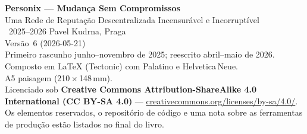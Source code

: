 \thispagestyle{empty}
\ifdefined\printmode\vspace*{\fill}\else{}\fi
\begin{flushleft}\small\sffamily
\textbf{Personix --- Mudança Sem Compromissos}\\[0.3em]
Uma Rede de Reputação Descentralizada Incensurável e Incorruptível\\[1.4em]

\textcopyright\ 2025--2026 Pavel Kudrna, Praga\\[0.4em]

Versão~6 (2026-05-21)\\
Primeiro rascunho junho--novembro de 2025; reescrito abril--maio de 2026.\\[1.4em]

Composto em \LaTeX{} (Tectonic) com Palatino e Helvetica\,Neue.\\
A5 paisagem (210\,$\times$\,148\,mm).\\[1.4em]

Licenciado sob \textbf{Creative Commons Attribution-ShareAlike 4.0
International (CC BY-SA 4.0)} ---
\href{https://creativecommons.org/licenses/by-sa/4.0/}{creativecommons.org/licenses/by-sa/4.0/}.
Os elementos reservados, o repositório de código e uma nota sobre as ferramentas
de produção estão listados no final do livro.
\end{flushleft}
\ifdefined\printmode\else{}\fi
\clearpage
